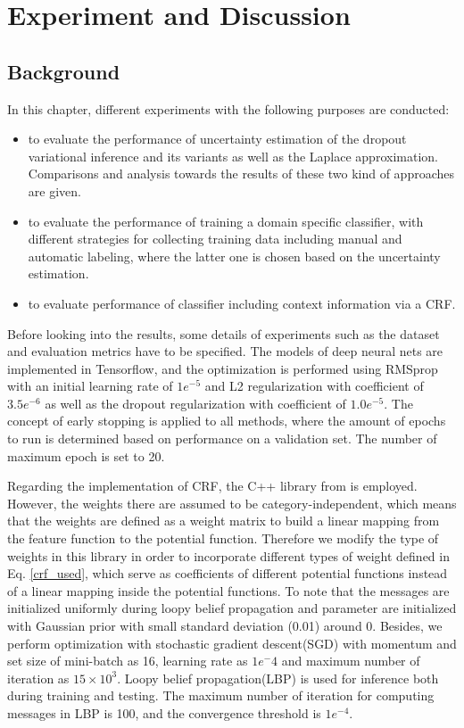 
\chapter{Experiment and Discussion}

\section{Background}
In this chapter, different experiments with the following purposes are conducted:
\begin{itemize}
	\item to evaluate the performance of uncertainty estimation of the dropout variational inference and its variants as well as the Laplace approximation. Comparisons and analysis towards the results of these two kind of approaches are given.
	
	\item to evaluate the performance of training a domain specific classifier, with different strategies for collecting training data including manual and automatic labeling, where the latter one is chosen based on the uncertainty estimation.
	
	\item to evaluate performance of classifier including context information via a CRF.
\end{itemize}

Before looking into the results, some details of experiments such as the dataset and evaluation metrics have to be specified.
The models of deep neural nets are implemented in Tensorflow\cite{abadi2016tensorflow}, and the optimization is performed using RMSprop with an initial learning rate of $1e^{-5}$ and L2 regularization with coefficient of $3.5e^{-6}$ as well as the dropout regularization with coefficient of $1.0e^{-5}$.
The concept of early stopping is applied to all methods, where the amount of epochs to run is determined based on performance on a validation set.
The number of maximum epoch is set to 20. 

Regarding the implementation of CRF, the C++ library from \cite{Ruiz-Sarmiento-REACTS-2015} is employed.
However, the weights there are assumed to be category-independent, which means that the weights are defined as a weight matrix to build a linear mapping from the feature function to the potential function.
Therefore we modify the type of weights in this library in order to incorporate different types of weight defined in Eq. \ref{crf_used}, which serve as coefficients of different potential functions instead of a linear mapping inside the potential functions. To note that the messages are initialized uniformly during loopy belief propagation and parameter are initialized with Gaussian prior with small standard deviation (0.01) around 0. Besides, we perform optimization with stochastic gradient descent(SGD) with momentum and set size of mini-batch as 16, learning rate as $1e^-4$ and maximum number of iteration as $15\times10^3$. Loopy belief propagation(LBP) is used for inference both during training and testing. The maximum number of iteration for computing messages in LBP is 100, and the convergence threshold is $1e^{-4}$.

